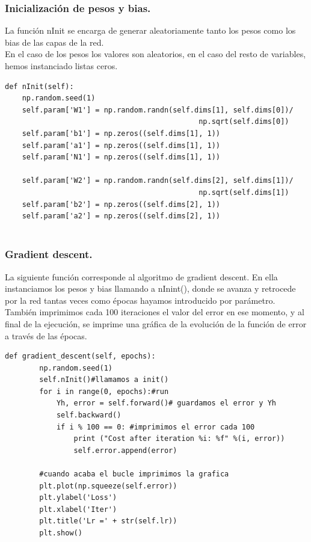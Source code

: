 \documentclass[a4paper,11pt]{article}
\begin{document}
\subsubsection{Inicialización de pesos y bias.}

La función nInit se encarga de generar aleatoriamente tanto los pesos como los bias de las capas de la red.\\
En el caso de los pesos los valores son aleatorios, en el caso del resto de variables, hemos instanciado listas ceros.
\begin{lstlisting}
def nInit(self): 
    np.random.seed(1)
    self.param['W1'] = np.random.randn(self.dims[1], self.dims[0])/ 
                                             np.sqrt(self.dims[0]) 
    self.param['b1'] = np.zeros((self.dims[1], 1))   
    self.param['a1'] = np.zeros((self.dims[1], 1))        
    self.param['N1'] = np.zeros((self.dims[1], 1))             
     
    self.param['W2'] = np.random.randn(self.dims[2], self.dims[1])/ 
                                             np.sqrt(self.dims[1]) 
    self.param['b2'] = np.zeros((self.dims[2], 1))     
    self.param['a2'] = np.zeros((self.dims[2], 1))   
      
\end{lstlisting}
\subsubsection{Gradient descent.}

La siguiente función corresponde al algoritmo de gradient descent. En ella instanciamos los pesos y bias llamando a nInint(), donde se avanza y retrocede por la red tantas veces como épocas hayamos introducido por parámetro. \\

\noindent
También imprimimos cada 100 iteraciones el valor del error en ese momento, y al final de la ejecución, se imprime una gráfica de la evolución de la función de error a través de las épocas.
\begin{lstlisting}
def gradient_descent(self, epochs):
        np.random.seed(1)                         
        self.nInit()#llamamos a init()
        for i in range(0, epochs):#run
            Yh, error = self.forward()# guardamos el error y Yh
            self.backward()
            if i % 100 == 0: #imprimimos el error cada 100 
                print ("Cost after iteration %i: %f" %(i, error)) 
                self.error.append(error) 

        #cuando acaba el bucle imprimimos la grafica	
        plt.plot(np.squeeze(self.error))
        plt.ylabel('Loss')
        plt.xlabel('Iter')
        plt.title('Lr =' + str(self.lr))
        plt.show()        

\end{lstlisting}
\end{document}
